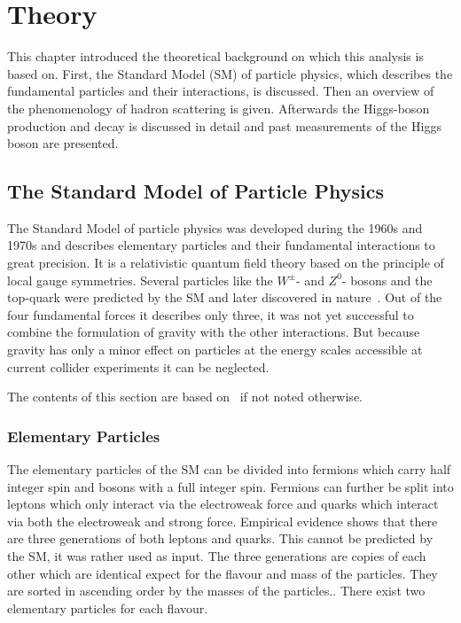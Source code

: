 \chapter{Theory}\label{cha:theory}

This chapter introduced the theoretical background on which this analysis is based on.
First, the Standard Model (SM) of particle physics, which describes the fundamental particles and their interactions, is discussed.
Then an overview of the phenomenology of hadron scattering is given.
Afterwards the Higgs-boson production and decay is discussed in detail and past measurements of the Higgs boson are presented.

\section{The Standard Model of Particle Physics}\label{sec:theory:sm}

The Standard Model of particle physics was developed during the 1960s and 1970s and
describes elementary particles and their fundamental interactions to great precision.
It is a relativistic quantum field theory based on the principle of local gauge symmetries.
Several particles like the $W^\pm$- and $Z^0$- bosons and the top-quark were predicted by the SM and later discovered in
nature~\cite{ZDiscovery,WDiscovery,TopDiscovery,ZeeDiscovery,WeDiscovery,TopDiscoveryD0}.
Out of the four fundamental forces it describes only three, it was not yet successful to combine the
formulation of gravity with the other interactions.
But because gravity has only a minor effect on particles at the energy scales accessible at current collider experiments
it can be neglected.

The contents of this section are based on~\cite{Griffiths,HalsenMartin,PeskinSchroeder} if not noted otherwise.

\subsection{Elementary Particles}\label{sub:theory:particles}

The elementary particles of the SM can be divided into fermions which carry half integer spin and bosons with a full integer spin.
Fermions can further be split into leptons which only interact via the electroweak force and quarks which interact via
both the electroweak and strong force.
Empirical evidence shows that there are three generations of both leptons and quarks.
This cannot be predicted by the SM, it was rather used as input.
The three generations are copies of each other which are identical expect for the flavour and mass of the particles.
They are sorted in ascending order by the masses of the particles..
There exist two elementary particles for each flavour.


